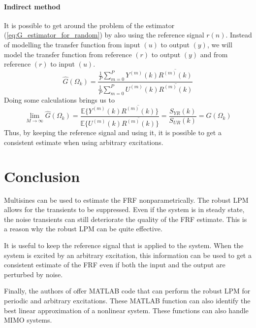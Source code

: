 \paragraph{Indirect method}
It is possible to get around the problem of the estimator (\ref{eq:G_estimator_for_random}) by also using the reference signal $r(n)$. Instead of modelling the transfer function from input $(u)$ to output $(y)$, we will model the transfer function from reference $(r)$ to output $(y)$ and from reference $(r)$ to input $(u)$.
\begin{equation}
    \hat G(\Omega_k) = \frac{ \frac{1}{P}\sum_{m=0}^P Y^{(m)}(k) \overline{R^{(m)}(k)} } { \frac{1}{P}\sum_{m=0}^P U^{(m)}(k) \overline{R^{(m)}(k)} }
    \label{eq:G_estimator_for_random_indirect}
\end{equation}
Doing some calculations brings us to
\begin{equation*}
    \lim_{M\rightarrow\infty} \hat G(\Omega_k) = \frac{ \mathbb{E}\{ Y^{(m)}(k) \overline{R^{(m)}(k)}\}} { \mathbb{E}\{ U^{(m)}(k) \overline{R^{(m)}(k)} \}} = \frac{ S_{Y\!R}(k)} { S_{U\!R}(k)} = G(\Omega_k)
\end{equation*}
Thus, by keeping the reference signal and using it, it is possible to get a consistent estimate when using arbitrary excitations.

\newpage
\section{Conclusion}
Multisines can be used to estimate the FRF nonparametrically. The robust LPM allows for the transients to be suppressed. Even if the system is in steady state, the noise transients can still deteriorate the quality of the FRF estimate. This is a reason why the robust LPM can be quite effective.

It is useful to keep the reference signal that is applied to the system. When the system is excited by an arbitrary excitation, this information can be used to get a consistent estimate of the FRF even if both the input and the output are perturbed by noise.

Finally, the authors of \cite{pintelon_book} offer MATLAB code that can perform the robust LPM for periodic and arbitrary excitations. These MATLAB function can also identify the best linear approximation of a nonlinear system. These functions can also handle MIMO systems.


